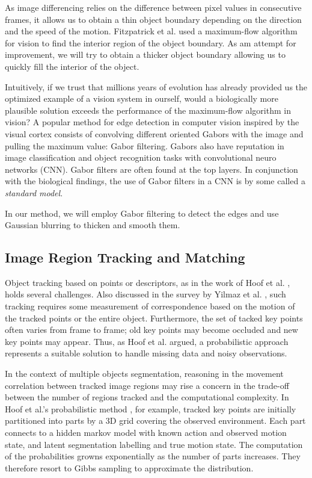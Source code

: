 \documentclass{article}
\begin{document}
As image differencing relies on the difference between pixel values in consecutive frames, it allows us to obtain a thin object boundary depending on the direction and the speed of the motion. Fitzpatrick et al. \cite{max-flow} used a maximum-flow algorithm for vision \cite{kolmo} to find the interior region of the object boundary. As am attempt for improvement, we will try to obtain a thicker object boundary allowing us to quickly fill the interior of the object. 

Intuitively, if we trust that millions years of evolution has already provided us the optimized example of a vision system in ourself, would a biologically more plausible solution exceeds the performance of the maximum-flow algorithm in vision? A popular method for edge detection in computer vision inspired by the visual cortex consists of convolving different oriented Gabors with the image and pulling the maximum value: Gabor filtering. Gabors also have reputation in image classification and object recognition tasks with convolutional neuro networks (CNN). Gabor filters are often found at the top layers. In conjunction with the biological findings, the use of Gabor filters in a CNN is by some called a \emph{standard model}. \cite{Gabor}

In our method, we will employ Gabor filtering to detect the edges and use Gaussian blurring to thicken and smooth them. 

\subsection{Image Region Tracking and Matching}

Object tracking based on points or descriptors, as in the work of Hoof et al. \cite{herke}, holds several challenges. Also discussed in the survey by Yilmaz et al. \cite{tracking}, such tracking requires some measurement of correspondence based on the motion of the tracked points or the entire object. Furthermore, the set of tacked key points often varies from frame to frame; old key points may become occluded and new key points may appear. Thus, as Hoof et al. argued, a probabilistic approach represents a suitable solution to handle missing data and noisy observations.

In the context of multiple objects segmentation, reasoning in the movement correlation between tracked image regions may rise a concern in the trade-off between the number of regions tracked and the computational complexity. In Hoof et al.'s probabilistic method \cite{herke}, for example, tracked key points are initially partitioned into parts by a 3D grid covering the observed environment. Each part connects to a hidden markov model with known action and observed motion state, and latent segmentation labelling and true motion state. The computation of the probabilities growns exponentially as the number of parts increases. They therefore resort to Gibbs sampling to approximate the distribution. 
\end{document}
